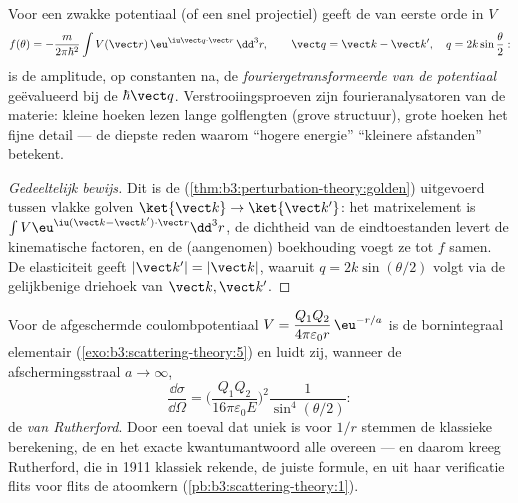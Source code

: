 \begin{theorem}[Bornbenadering]\label{thm:b3:scattering-theory:born}
Voor een zwakke potentiaal (of een snel projectiel) geeft de
 van eerste orde in $V$
\[
f(\theta) = -\frac{m}{2\pi\hbar^2}
\int V(\vect r)\,\eu^{\iu\vect q\cdot\vect r}\,\dd^3r ,
\qquad
\vect q = \vect k - \vect k' , \quad
q = 2k\sin\frac\theta2 :
\]
is de amplitude, op constanten na, de \emph{fouriergetransformeerde van de
potentiaal} geëvalueerd bij de  $\hbar\vect q$.
Verstrooiingsproeven zijn fourieranalysatoren van de materie: kleine hoeken
lezen lange golflengten (grove structuur), grote hoeken het fijne detail
--- de diepste reden waarom ``hogere energie'' ``kleinere afstanden''
betekent.
\end{theorem}

\begin{proof}[Gedeeltelijk bewijs]
Dit is de 
(\cref{thm:b3:perturbation-theory:golden}) uitgevoerd tussen vlakke golven
$\ket{\vect k} \to \ket{\vect k'}$: het matrixelement is
$\int V\eu^{\iu(\vect k - \vect k')\cdot\vect r}\dd^3r$, de dichtheid van
de eindtoestanden levert de kinematische factoren, en de (aangenomen)
boekhouding voegt ze tot $f$ samen. De elasticiteit geeft $|\vect k'| = |\vect k|$, waaruit $q = 2k\sin(\theta/2)$ volgt via de gelijkbenige
driehoek van $\vect k, \vect k'$.
\end{proof}

\begin{example}\label{ex:b3:scattering-theory:rutherford}
Voor de afgeschermde coulombpotentiaal $V = \dfrac{Q_1Q_2}{4\pi
\varepsilon_0 r}\,\eu^{-r/a}$ is de bornintegraal elementair
(\cref{exo:b3:scattering-theory:5}) en luidt zij, wanneer de
afschermingsstraal $a \to \infty$,
\[
\frac{\dd\sigma}{\dd\Omega} =
\Big(\frac{Q_1Q_2}{16\pi\varepsilon_0 E}\Big)^2
\frac{1}{\sin^4(\theta/2)} :
\]
de \emph{ van Rutherford}. Door een toeval dat uniek is
voor $1/r$ stemmen de klassieke berekening, de  en het exacte
kwantumantwoord alle overeen --- en daarom kreeg Rutherford, die in 1911
klassiek rekende, de juiste formule, en uit haar verificatie flits voor
flits de atoomkern
(\cref{pb:b3:scattering-theory:1}).
\end{example}

